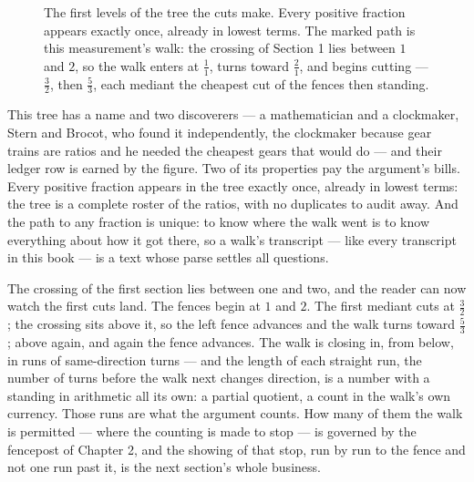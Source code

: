 \begin{figure}[htbp]
\centering
{}
\caption{The first levels of the tree the cuts make. Every positive fraction appears
exactly once, already in lowest terms. The marked path is this measurement's walk:
the crossing of Section 1 lies between $1$ and $2$, so the walk enters at $\frac{1}{1}$,
turns toward $\frac{2}{1}$, and begins cutting --- $\frac{3}{2}$, then $\frac{5}{3}$,
each mediant the cheapest cut of the fences then standing.}
\end{figure}

This tree has a name and two discoverers --- a mathematician and a clockmaker, Stern
and Brocot, who found it independently, the clockmaker because gear trains are ratios
and he needed the cheapest gears that would do --- and their ledger row is earned by
the figure. Two of its properties pay the argument's bills. Every positive fraction
appears in the tree exactly once, already in lowest terms: the tree is a complete
roster of the ratios, with no duplicates to audit away. And the path to any fraction
is unique: to know where the walk went is to know everything about how it got there,
so a walk's transcript --- like every transcript in this book --- is a text whose
parse settles all questions.

The crossing of the first section lies between one and two, and the reader can now
watch the first cuts land. The fences begin at $1$ and $2$. The first mediant cuts at
$\frac{3}{2}$; the crossing sits above it, so the left fence advances and the walk
turns toward $\frac{5}{3}$; above again, and again the fence advances. The walk is
closing in, from below, in runs of same-direction turns --- and the length of each
straight run, the number of turns before the walk next changes direction, is a number
with a standing in arithmetic all its own: a partial quotient, a count in the walk's
own currency. Those runs are what the argument counts. How many of them the walk is
permitted --- where the counting is made to stop --- is governed by the fencepost of
Chapter 2, and the showing of that stop, run by run to the fence and not one run
past it, is the next section's whole business.

